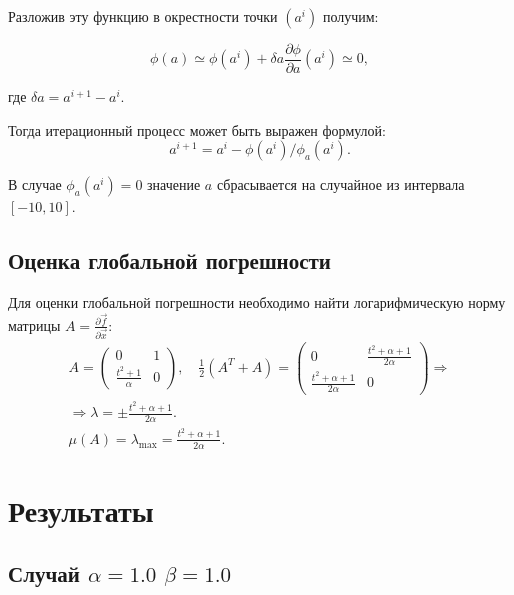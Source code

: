 \documentclass[a4paper,12pt]{article}
\begin{document}
Разложив эту функцию в окрестности точки \((a^{i})\) получим:

\begin{equation*}
  \phi(a)\simeq\phi(a^{i})+\delta a\frac{\partial \phi}{\partial a}(a^{i})\simeq0,
\end{equation*}

где \(\delta a=a^{i+1}-a^{i}\). 

Тогда итерационный процесс может быть выражен формулой:
\begin{equation*}
  a^{i+1}=a^{i}-\phi(a^{i}) / \phi_a(a^{i}).
\end{equation*}

В случае \(\phi_a(a^{i})=0\) значение \(a\) сбрасывается на случайное из интервала \([-10, 10]\).

\subsection*{Оценка глобальной погрешности}
Для оценки глобальной погрешности необходимо найти логарифмическую норму матрицы \(A=\frac{\partial \vec{f}}{\partial \vec{x}}\):
\begin{gather*}
  A=\begin{pmatrix}
    0                    & 1  \\
    \frac{t^2+1}{\alpha} & 0
  \end{pmatrix}, \quad \frac{1}{2}\left(A^T+A\right)=\begin{pmatrix}
    0                            & \frac{t^2+\alpha+1}{2\alpha} \\
    \frac{t^2+\alpha+1}{2\alpha} & 0
  \end{pmatrix}\Rightarrow\\
  \Rightarrow \lambda=\pm\frac{t^2+\alpha+1}{2\alpha}.\\
  \mu(A) = \lambda_{\max}=\frac{t^2+\alpha+1}{2\alpha}.
\end{gather*}

\section*{Результаты}

\subsection*{Случай \(\alpha=1.0\) \(\beta=1.0\)}
\end{document}
